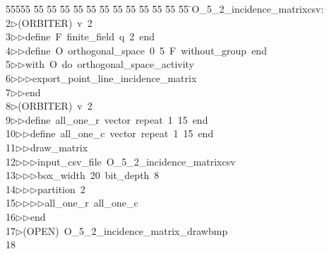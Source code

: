 %
%
\begin{tabbing}
55555 \= 55 \= 55 \= 55 \= 55 \= 55 \= 55 \= 55 \= 55 \= 55 \= 55 \= 55 \= 55 \= \>O\_5\_2\_incidence\_matrixcsv:\\[0pt]
2\>$\triangleright$\>(ORBITER)\ v\ 2\ \\[0pt]
3\>$\triangleright$\>$\triangleright$\>define\ F\ finite\_field\ q\ 2\ end\ \\[0pt]
4\>$\triangleright$\>$\triangleright$\>define\ O\ orthogonal\_space\ 0\ 5\ F\ without\_group\ end\ \\[0pt]
5\>$\triangleright$\>$\triangleright$\>with\ O\ do\ orthogonal\_space\_activity\ \\[0pt]
6\>$\triangleright$\>$\triangleright$\>$\triangleright$\>export\_point\_line\_incidence\_matrix\ \\[0pt]
7\>$\triangleright$\>$\triangleright$\>end\\[0pt]
8\>$\triangleright$\>(ORBITER)\ v\ 2\ \\[0pt]
9\>$\triangleright$\>$\triangleright$\>define\ all\_one\_r\ vector\ repeat\ 1\ 15\ end\ \\[0pt]
10\>$\triangleright$\>$\triangleright$\>define\ all\_one\_c\ vector\ repeat\ 1\ 15\ end\ \\[0pt]
11\>$\triangleright$\>$\triangleright$\>draw\_matrix\ \\[0pt]
12\>$\triangleright$\>$\triangleright$\>$\triangleright$\>input\_csv\_file\ O\_5\_2\_incidence\_matrixcsv\ \\[0pt]
13\>$\triangleright$\>$\triangleright$\>$\triangleright$\>box\_width\ 20\ bit\_depth\ 8\ \\[0pt]
14\>$\triangleright$\>$\triangleright$\>$\triangleright$\>partition\ 2\ \\[0pt]
15\>$\triangleright$\>$\triangleright$\>$\triangleright$\>$\triangleright$\>all\_one\_r\ all\_one\_c\ \\[0pt]
16\>$\triangleright$\>$\triangleright$\>end\\[0pt]
17\>$\triangleright$\>(OPEN)\ O\_5\_2\_incidence\_matrix\_drawbmp\\[0pt]
18\>\end{tabbing}
